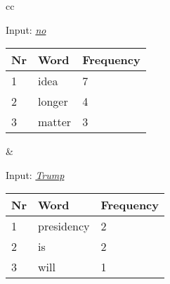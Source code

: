 \documentclass{article}
\begin{document}
        \begin{tabular}{cc}
          \begin{minipage}{.5\linewidth}
            \hspace{4em}Input: \emph{\underline{no}}\\
            \begin{tabular}{l|l|l}
              Nr & Word & Frequency \\ \hline
              1 & idea & 7 \\ \hline
              2 & longer & 4 \\ \hline
              3 & matter & 3 \\
            \end{tabular}
          \end{minipage} &

          \begin{minipage}{.5\linewidth}
            \hspace{4em}Input: \emph{\underline{Trump}}\\
            \begin{tabular}{l|l|l}
              Nr & Word & Frequency \\ \hline
              1 & presidency & 2 \\ \hline
              2 & is & 2 \\ \hline
              3 & will & 1 \\
            \end{tabular}
          \end{minipage}
        \end{tabular}
\end{document}
